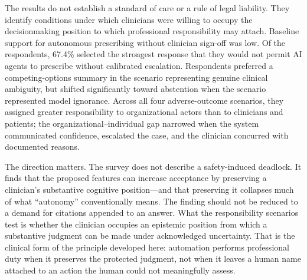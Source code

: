 The results do not establish a standard of care or a rule of legal liability. They identify conditions under which clinicians were willing to occupy the decisionmaking position to which professional responsibility may attach. Baseline support for autonomous prescribing without clinician sign-off was low. Of the respondents, 67.4\% selected the strongest response that they would not permit AI agents to prescribe without calibrated escalation. Respondents preferred a competing-options summary in the scenario representing genuine clinical ambiguity, but shifted significantly toward abstention when the scenario represented model ignorance. Across all four adverse-outcome scenarios, they assigned greater responsibility to organizational actors than to clinicians and patients; the organizational--individual gap narrowed when the system communicated confidence, escalated the case, and the clinician concurred with documented reasons.

The direction matters. The survey does not describe a safety-induced deadlock. It finds that the proposed features can increase acceptance by preserving a clinician's substantive cognitive position---and that preserving it collapses much of what ``autonomy'' conventionally means. The finding should not be reduced to a demand for citations appended to an answer. What the responsibility scenarios test is whether the clinician occupies an epistemic position from which a substantive judgment can be made under acknowledged uncertainty. That is the clinical form of the principle developed here: automation performs professional duty when it preserves the protected judgment, not when it leaves a human name attached to an action the human could not meaningfully assess.

